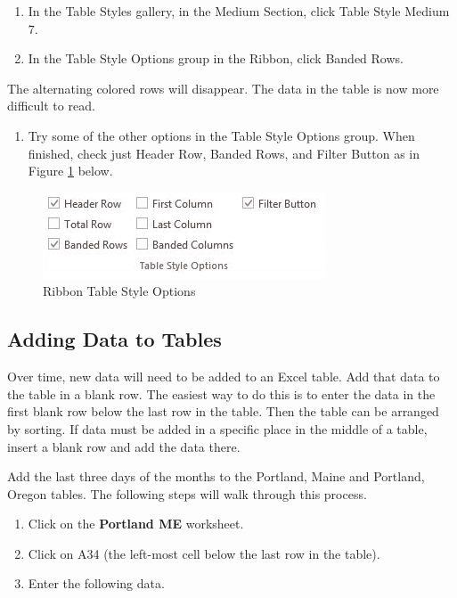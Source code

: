 \begin{enumerate}[resume]
	\item In the Table Styles gallery, in the Medium Section, click Table Style Medium $ 7 $.
	\item In the Table Style Options group in the Ribbon, click Banded Rows.
\end{enumerate}

The alternating colored rows will disappear. The data in the table is now more difficult to read.

\begin{enumerate}
	\item Try some of the other options in the Table Style Options group. When finished, check just Header Row, Banded Rows, and Filter Button as in Figure \ref{05:fig05} below.
\end{enumerate}

\begin{figure}[H]
	\centering
	\includegraphics[width=\maxwidth{.95\linewidth}]{gfx/ch05_fig05}
	\caption{Ribbon Table Style Options}
	\label{05:fig05}
\end{figure}

\subsection{Adding Data to Tables}

Over time, new data will need to be added to an Excel table. Add that data to the table in a blank row. The easiest way to do this is to enter the data in the first blank row below the last row in the table. Then the table can be arranged by sorting. If data must be added in a specific place in the middle of a table, insert a blank row and add the data there.

Add the last three days of the months to the Portland, Maine and Portland, Oregon tables. The following steps will walk through this process.

\begin{enumerate}
	\item Click on the \textbf{Portland ME} worksheet.
	\item Click on \textsf{A34} (the left-most cell below the last row in the table).
	\item Enter the following data.
\end{enumerate}

